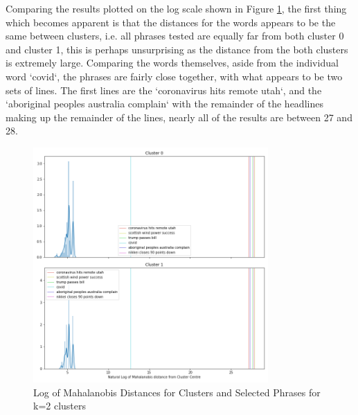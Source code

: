 Comparing the results plotted on the log scale shown in Figure \ref{fig:wordsk2}, the first thing which becomes apparent is that the distances for the words appears to be the same between clusters, i.e. all phrases tested are equally far from both cluster 0 and cluster 1, this is perhaps unsurprising as the distance from the both clusters is extremely large. Comparing the words themselves, aside from the individual word `covid`, the phrases are fairly close together, with what appears to be two sets of lines. The first lines are the `coronavirus hits remote utah`, and the `aboriginal peoples australia complain` with the remainder of the headlines making up the remainder of the lines, nearly all of the results are between 27 and 28.  
\begin{figure}[H]
	\centering
	\includegraphics[width=0.8\textwidth]{images/words_kmeans_mahalanobis_distance_k=2.png}
	\caption{Log of Mahalanobis Distances for Clusters and Selected Phrases for k=2 clusters}
	\label{fig:wordsk2}
\end{figure}

